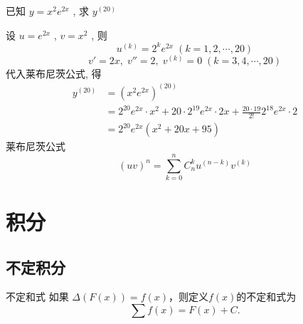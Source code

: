 \documentclass[color=green,titlestyle=hang]{elegantbook}%
\begin{document}
\begin{exercise}  已知 $\displaystyle y=x^2e^{2x}$ , 求 $\displaystyle y^{(20)}$\\[-3mm]
\end{exercise}\begin{Solution}设 $\displaystyle u=e^{2x}$ , $\displaystyle v=x^2$ ,  则
\begin{equation*}u^{(k)}=2^ke^{2x}\;(k=1,2,\cdots,20)\end{equation*}
\begin{equation*}v'=2x,\;v''=2,\;v^{(k)}=0\;(k=3,4,\cdots,20)\end{equation*}
代入莱布尼茨公式, 得\begin{align*}y^{(20)}&=(x^2e^{2x})^{(20)}\\
&=2^{20}e^{2x}\cdot x^2+20\cdot2^{19}e^{2x}\cdot2x+\frac{20\cdot19}{2!}2^{18}e^{2x}\cdot2\\
&=2^{20}e^{2x}(x^2+20x+95)
\end{align*}
莱布尼茨公式\begin{equation*}(uv)^{n}=\sum_{k=0}^{n}C_n^ku^{(n-k)}v^{(k)}\end{equation*}	
\end{Solution}

\chapter{积分}
\section{不定积分}

\begin{definition}{不定和式}{}
如果 $\Delta(F(x))=f(x)$，则定义$f(x)$的{\color{blue}不定和式}为
\[ \sum f(x) = F(x) + C. \]
\end{definition}
\end{document}
